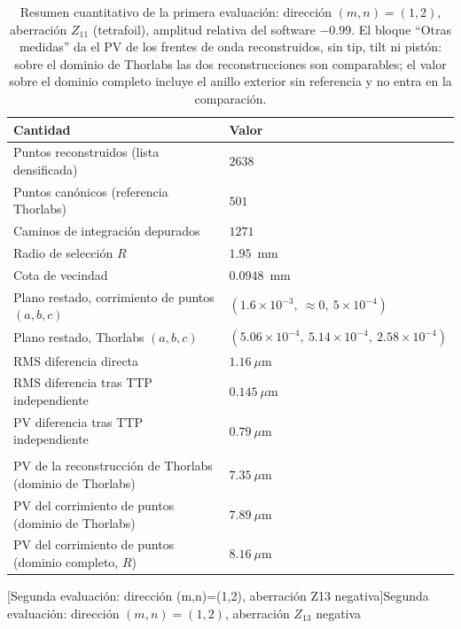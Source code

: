 \documentclass[letterpaper,12pt,oneside]{book}
\makeatletter
\renewcommand\section{\@startsection{section}{1}{\z@}{-3.5ex \@plus -1ex \@minus -.2ex}{2.3ex \@plus.2ex}{\normalfont\Large\bfseries\raggedright}}
\makeatother
\begin{document}
\begin{table}[htbp]
\centering
\caption{Resumen cuantitativo de la primera evaluación: dirección $(m,n)=(1,2)$,
aberración $Z_{11}$ (tetrafoil), amplitud relativa del software $-0.99$. El bloque
``Otras medidas'' da el PV de los frentes de onda reconstruidos, sin tip, tilt ni pistón:
sobre el dominio de Thorlabs las dos reconstrucciones son comparables; el valor sobre
el dominio completo incluye el anillo exterior sin referencia y no entra en la
comparación.}
\label{tab:cap5-resumen-eval1}
\small
\begin{tabularx}{\textwidth}{>{\raggedright\arraybackslash}Xl}
\hline
\textbf{Cantidad} & \textbf{Valor} \\
\hline
Puntos reconstruidos (lista densificada) & $2638$ \\
Puntos canónicos (referencia Thorlabs)   & $501$ \\
Caminos de integración depurados         & $1271$ \\
Radio de selección $R$                   & $1.95$~mm \\
Cota de vecindad                         & $0.0948$~mm \\
\hline
Plano restado, corrimiento de puntos $(a, b, c)$ & $(1.6\times 10^{-3},\ \approx 0,\ 5\times 10^{-4})$ \\
Plano restado, Thorlabs $(a, b, c)$              & $(5.06\times 10^{-4},\ 5.14\times 10^{-4},\ 2.58\times 10^{-4})$ \\
\hline
RMS diferencia directa                   & $1.16~\mu$m \\
RMS diferencia tras TTP independiente    & $0.145~\mu$m \\
PV diferencia tras TTP independiente     & $0.79~\mu$m \\
\hline
\multicolumn{2}{l}{\textit{Otras medidas: PV de los frentes de onda reconstruidos}} \\
PV de la reconstrucción de Thorlabs (dominio de Thorlabs) & $7.35~\mu$m \\
PV del corrimiento de puntos (dominio de Thorlabs)        & $7.89~\mu$m \\
PV del corrimiento de puntos (dominio completo, $R$)         & $8.16~\mu$m \\
\hline
\end{tabularx}
\end{table}

\section[Segunda evaluación: dirección (m,n)=(1,2), aberración Z13 negativa]{Segunda evaluación: dirección \mbox{$(m,n)=(1,2)$}, aberración $Z_{13}$ negativa}\label{sec:eval-z13-m1n2}
\end{document}
